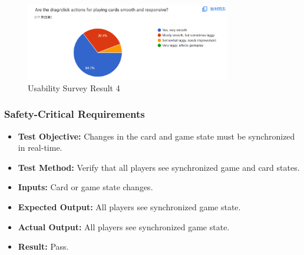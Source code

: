 \documentclass[12pt, titlepage]{article}
\begin{document}
\begin{figure}[h!]
    \centering
    \includegraphics[width=0.8\textwidth]{image3.png}
    \caption{Usability Survey Result 4}
    \label{fig:labelname}
\end{figure}

\subsubsection{Safety-Critical Requirements}
\begin{itemize}
    \item \textbf{Test Objective:} Changes in the card and game state must be synchronized in real-time.
    \item \textbf{Test Method:} Verify that all players see synchronized game and card states.
    \item \textbf{Inputs:} Card or game state changes.
    \item \textbf{Expected Output:} All players see synchronized game state.
    \item \textbf{Actual Output:} All players see synchronized game state.
    \item \textbf{Result:} Pass.
\end{itemize}
\end{document}
